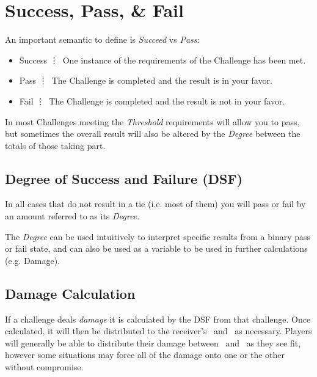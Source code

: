 \section{Success, Pass, \& Fail}\label{sec:success}
An important semantic to define is \emph{Succeed} vs \emph{Pass}:

\begin{itemize}
\item Success \vdots\ One instance of the requirements of the Challenge has been met.
\item Pass \vdots\ The Challenge is completed and the result is in your favor.
\item Fail \vdots\ The Challenge is completed and the result is not in your favor.
\end{itemize}
In most Challenges meeting the \emph{Threshold} requirements will allow you to pass, but sometimes the overall result will also be altered by the \emph{Degree} between the totals of those taking part.   



\subsection{Degree of Success and Failure (DSF)}\label{subsec:dsf}
In all cases that do not result in a tie (i.e. most of them) you will
pass or fail by an amount referred to as its \emph{Degree}. 


The \emph{Degree} can be used intuitively to interpret specific results from
a binary pass or fail state, and can also be used as a variable to be used in further calculations
(e.g. Damage).

\subsection{Damage Calculation}\label{subsec:damage_calc}
If a challenge deals \emph{damage} it is calculated by the DSF from that challenge. Once calculated, it will then be distributed to the receiver's \HPful\ and \ENful\ as necessary. Players will generally be able to distribute their damage between \HPful\ and \ENful\ as they see fit, however some situations may force all of the damage onto one or the other without compromise. 

